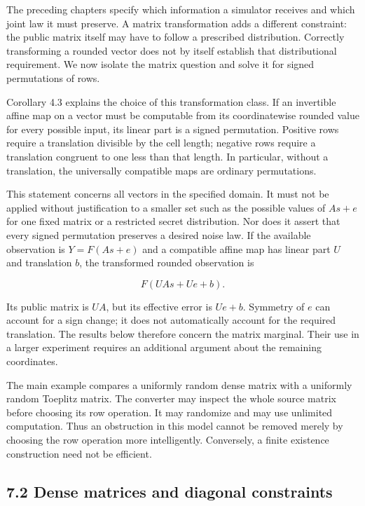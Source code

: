 \documentclass[
]{article}
\begin{document}
The preceding chapters specify which information a simulator receives
and which joint law it must preserve. A matrix transformation adds a
different constraint: the public matrix itself may have to follow a
prescribed distribution. Correctly transforming a rounded vector does
not by itself establish that distributional requirement. We now isolate
the matrix question and solve it for signed permutations of rows.

Corollary 4.3 explains the choice of this transformation class. If an
invertible affine map on a vector must be computable from its
coordinatewise rounded value for every possible input, its linear part
is a signed permutation. Positive rows require a translation divisible
by the cell length; negative rows require a translation congruent to one
less than that length. In particular, without a translation, the
universally compatible maps are ordinary permutations.

This statement concerns all vectors in the specified domain. It must not
be applied without justification to a smaller set such as the possible
values of \(As+e\) for one fixed matrix or a restricted secret
distribution. Nor does it assert that every signed permutation preserves
a desired noise law. If the available observation is \(Y=F(As+e)\) and a
compatible affine map has linear part \(U\) and translation \(b\), the
transformed rounded observation is

\[
F(UAs+Ue+b).
\]

Its public matrix is \(UA\), but its effective error is \(Ue+b\).
Symmetry of \(e\) can account for a sign change; it does not
automatically account for the required translation. The results below
therefore concern the matrix marginal. Their use in a larger experiment
requires an additional argument about the remaining coordinates.

The main example compares a uniformly random dense matrix with a
uniformly random Toeplitz matrix. The converter may inspect the whole
source matrix before choosing its row operation. It may randomize and
may use unlimited computation. Thus an obstruction in this model cannot
be removed merely by choosing the row operation more intelligently.
Conversely, a finite existence construction need not be efficient.

\subsection{7.2 Dense matrices and diagonal
constraints}\label{dense-matrices-and-diagonal-constraints}
\end{document}
